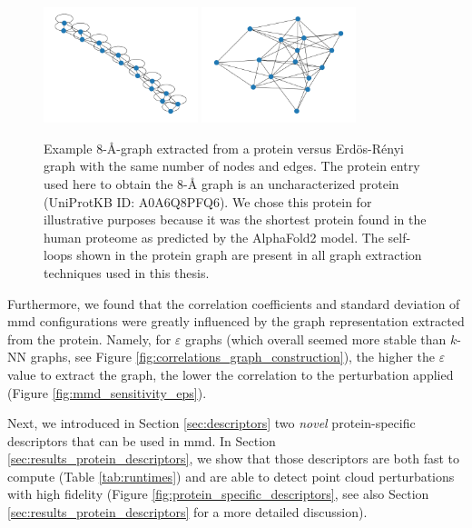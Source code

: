 \begin{figure}
  \centering
  \includegraphics[width=0.4\textwidth]{./figures/results/8_a_graph.pdf}
  \includegraphics[width=0.4\textwidth]{./figures/results/er_graph_8_a_params.pdf}
  \caption[Example 8-\si{\angstrom}-graph vs Erd\"os-Rényi graph with the same
number of nodes and edges.]{Example 8-\si{\angstrom}-graph extracted from a
protein versus Erd\"os-Rényi graph with the same number of nodes and edges. The
protein entry used here to obtain the 8-\si{\angstrom} graph is an
uncharacterized protein (UniProtKB ID: A0A6Q8PFQ6). We chose this protein for
illustrative purposes because it was the shortest protein found in the human
proteome as predicted by the AlphaFold2 model. The self-loops shown in the
protein graph are present in all graph extraction techniques used in this
thesis.}
  \label{fig:er_comparison_8a_graph}
\end{figure}

Furthermore, we found that the correlation coefficients and standard deviation
of \acrshort{mmd} configurations were greatly influenced by the graph
representation extracted from the protein. Namely, for $\varepsilon$ graphs
(which overall seemed more stable than $k$-NN graphs, see Figure
\ref{fig:correlations_graph_construction}), the higher the $\varepsilon$ value
to extract the graph, the lower the correlation to the perturbation applied
(Figure \ref{fig:mmd_sensitivity_eps}).

Next, we introduced in Section \ref{sec:descriptors} two \emph{novel}
protein-specific descriptors that can be used in \acrshort{mmd}. In Section
\ref{sec:results_protein_descriptors}, we show that those descriptors are both
fast to compute (Table \ref{tab:runtimes}) and are able to detect point cloud
perturbations with high fidelity (Figure \ref{fig:protein_specific_descriptors},
see also Section \ref{sec:results_protein_descriptors} for a more detailed
discussion).


